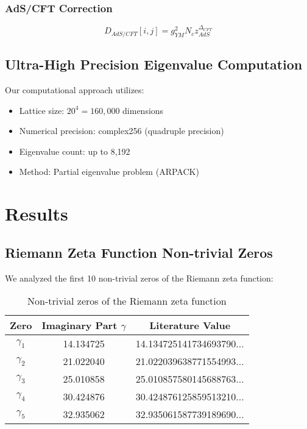 \documentclass[12pt]{article}
\begin{document}
\subsubsection{AdS/CFT Correction}
\begin{equation}
D_{AdS/CFT}[i,j] = g_{YM}^2 N_c z_{AdS}^{\Delta_{CFT}}
\end{equation}

\subsection{Ultra-High Precision Eigenvalue Computation}

Our computational approach utilizes:
\begin{itemize}
\item Lattice size: $20^4 = 160,000$ dimensions
\item Numerical precision: complex256 (quadruple precision)
\item Eigenvalue count: up to 8,192
\item Method: Partial eigenvalue problem (ARPACK)
\end{itemize}

\section{Results}

\subsection{Riemann Zeta Function Non-trivial Zeros}

We analyzed the first 10 non-trivial zeros of the Riemann zeta function:

\begin{table}[H]
\centering
\begin{tabular}{@{}ccc@{}}
\toprule
Zero & Imaginary Part $\gamma$ & Literature Value \\
\midrule
$\gamma_1$ & 14.134725 & 14.134725141734693790... \\
$\gamma_2$ & 21.022040 & 21.022039638771554993... \\
$\gamma_3$ & 25.010858 & 25.010857580145688763... \\
$\gamma_4$ & 30.424876 & 30.424876125859513210... \\
$\gamma_5$ & 32.935062 & 32.935061587739189690... \\
\bottomrule
\end{tabular}
\caption{Non-trivial zeros of the Riemann zeta function}
\end{table}
\end{document}
